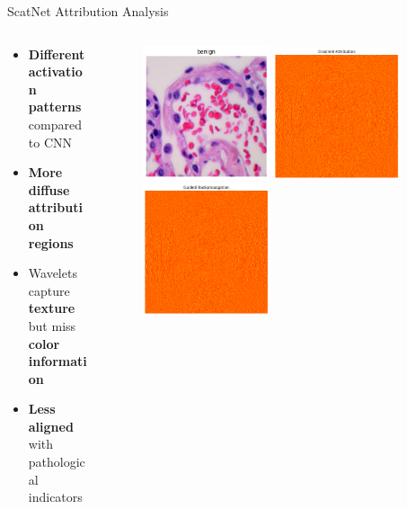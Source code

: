 \documentclass[aspectratio=169,8pt]{beamer}  %
\begin{document}
\begin{frame}{ScatNet Attribution Analysis}
\begin{columns}[T]
\begin{column}{0.5\textwidth}
\begin{itemize}
\item \textbf{Different activation patterns} compared to CNN
\item \textbf{More diffuse attribution regions}
\item Wavelets capture \textbf{texture} but miss \textbf{color information}
\item \textbf{Less aligned} with pathological indicators
\end{itemize}
\end{column}
\begin{column}{0.5\textwidth}
\begin{figure}
\includegraphics[width=0.45\textwidth]{imgs/normal_image.png}
\vspace{0.2cm}
\includegraphics[width=0.45\textwidth]{imgs/scatnet_bp.png}
\vspace{0.2cm}
\includegraphics[width=0.45\textwidth]{imgs/scatnet_gbp.png}

\end{figure}
\end{column}
\end{columns}
\end{frame}
\end{document}
